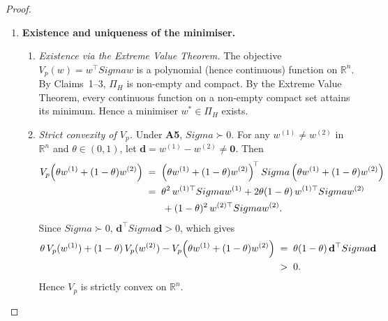 \documentclass[12pt,openany]{book}
\newcommand{\R}{\mathbb{R}}
\newcommand{\bfw}{\mathbf{w}}
\newcommand{\bfSigma}{\boldsymbol{\Sigma}}
\numberwithin{equation}{chapter}
\theoremstyle{plain}
\theoremstyle{definition}
\theoremstyle{remark}
\def\bfw{w}%
\def\bfSigma{Sigma}%
\begin{document}
\begin{proof}
\begin{enumerate}
\begin{enumerate}
    \item \textit{Conclusion.}
          All constraints are satisfied by $\bfw^{\theta}$, so
          $\bfw^{\theta} \in \Pi_H$.  Since $\theta \in [0,1]$ and
          $\bfw^{(1)},\bfw^{(2)} \in \Pi_H$ were arbitrary,
          $\Pi_H$ is convex.
  \end{enumerate}

\item \textbf{Existence and uniqueness of the minimiser.}

  \begin{enumerate}
    \item \textit{Existence via the Extreme Value Theorem.}
          The objective $V_p(\bfw) = \bfw^{\top}\bfSigma\bfw$ is a
          polynomial (hence continuous) function on $\R^n$.  By
          Claims~1--3, $\Pi_H$ is non-empty and compact.  By the
          Extreme Value Theorem, every continuous function on a
          non-empty compact set attains its minimum.  Hence a
          minimiser $\bfw^* \in \Pi_H$ exists.

    \item \textit{Strict convexity of $V_p$.}
          Under \textbf{A5}, $\bfSigma \succ 0$.
          For any $\bfw^{(1)} \neq \bfw^{(2)}$ in $\R^n$ and
          $\theta \in (0,1)$, let
          $\mathbf{d} = \bfw^{(1)} - \bfw^{(2)} \neq \mathbf{0}$.
          Then
          \begin{align}
            V_p\!\left(\theta\bfw^{(1)}
              + (1-\theta)\bfw^{(2)}\right)
            &\;=\;
            \left(\theta\bfw^{(1)}
              + (1-\theta)\bfw^{(2)}\right)^{\!\top}
            \bfSigma
            \left(\theta\bfw^{(1)}
              + (1-\theta)\bfw^{(2)}\right)
            \notag\\
            &\;=\;
            \theta^2\,\bfw^{(1)\top}\bfSigma\bfw^{(1)}
            + 2\theta(1-\theta)\,
              \bfw^{(1)\top}\bfSigma\bfw^{(2)}
            \notag\\
            &\qquad
            + (1-\theta)^2\,\bfw^{(2)\top}\bfSigma\bfw^{(2)}.
            \label{eq:quad-expand}
          \end{align}
          Since $\bfSigma \succ 0$,
          $\mathbf{d}^{\top}\bfSigma\mathbf{d} > 0$, which gives
          \begin{align}
            \theta\,V_p(\bfw^{(1)})
            + (1-\theta)\,V_p(\bfw^{(2)})
            - V_p\!\left(\theta\bfw^{(1)}
              +(1-\theta)\bfw^{(2)}\right)
            &\;=\;
            \theta(1-\theta)\,\mathbf{d}^{\top}\bfSigma\mathbf{d}
            \notag\\
            &\;>\; 0.
            \label{eq:strict-cvx-gap}
          \end{align}
          Hence $V_p$ is strictly convex on $\R^n$.


\end{enumerate}
\end{enumerate}
\end{proof}
\end{document}
